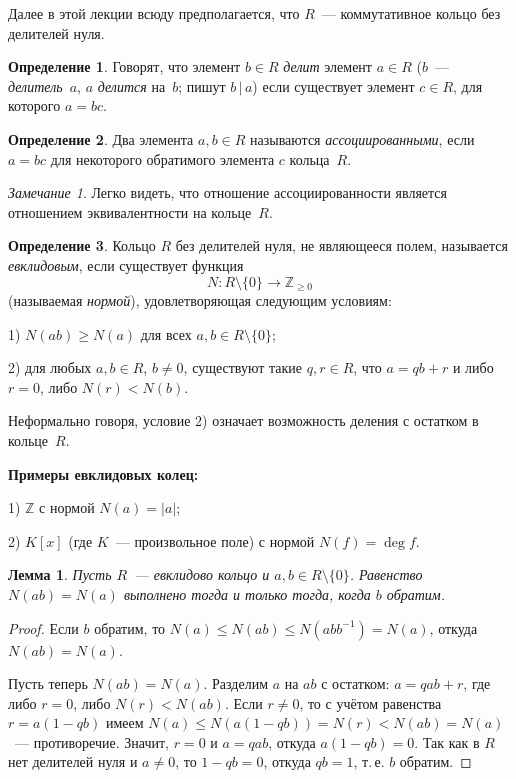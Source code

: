 \documentclass[a4paper,10pt]{amsart}
\def\ZZ{{\mathbb Z}}%
\newtheorem{lemma}{Лемма}
\theoremstyle{definition}
\newtheorem{definition}{Определение}
\theoremstyle{remark}
\newtheorem{remark}{Замечание}
\begin{document}
Далее в этой лекции всюду предполагается, что $R$~--- коммутативное кольцо
без делителей нуля.

\begin{definition}
Говорят, что элемент $b \in R$ {\it делит} элемент $a\in R$ ($b$~---
\textit{делитель}~$a$, $a$ \textit{делится} на~$b$; пишут $b \,|\,
a$) если существует элемент $c\in R$, для которого $a=bc$.
\end{definition}

\begin{definition}
Два элемента $a, b \in R$ называются {\it ассоциированными}, если
$a=bc$ для некоторого обратимого элемента $c$ кольца~$R$.
\end{definition}

\begin{remark}
Легко видеть, что отношение ассоциированности является отношением
эквивалентности на кольце~$R$.
\end{remark}

\begin{definition}
Кольцо $R$ без делителей нуля, не являющееся полем, называется {\it
евклидовым}, если существует функция
$$
N\colon R\setminus\{0\} \to \ZZ_{\geqslant 0}
$$
(называемая {\it нормой}), удовлетворяющая следующим условиям:

1) $N(ab) \geqslant N(a)$ для всех $a, b \in R \setminus \{0\}$;

2) для любых $a, b \in R$, $b \ne 0$, существуют такие $q,r\in R$,
что $a = qb + r$ и либо $r = 0$, либо $N(r) < N(b)$.
\end{definition}

Неформально говоря, условие 2) означает возможность \guillemotleft
деления с остатком\guillemotright{} в кольце~$R$.

\textbf{Примеры евклидовых колец:}

1) $\ZZ$ с нормой $N(a) = |a|$;

2) $K[x]$ (где $K$~--- произвольное поле) с нормой $N(f) = \deg f$.

\begin{lemma} \label{lemma_first}
Пусть $R$~--- евклидово кольцо и $a,b \in R \setminus \lbrace 0
\rbrace$. Равенство $N(ab) = N(a)$ выполнено тогда и только тогда,
когда $b$ обратим.
\end{lemma}

\begin{proof}
Если $b$ обратим, то $N(a)\leqslant N(ab)\leqslant
N(abb^{-1})=N(a)$, откуда $N(ab)=N(a)$.

Пусть теперь $N(ab) = N(a)$. Разделим $a$ на $ab$ с остатком: $a =
qab + r$, где либо $r = 0$, либо $N(r) < N(ab)$. Если $r \ne 0$, то
с учётом равенства $r = a(1-qb)$ имеем $N(a) \leqslant N(a(1-qb)) =
N(r) < N(ab) = N(a)$~--- противоречие. Значит, $r = 0$ и $a = qab$,
откуда $a(1 - qb) = 0$. Так как в $R$ нет делителей нуля и $a \ne
0$, то $1 - qb = 0$, откуда $qb = 1$, т.\,е. $b$ обратим.
\end{proof}
\end{document}

